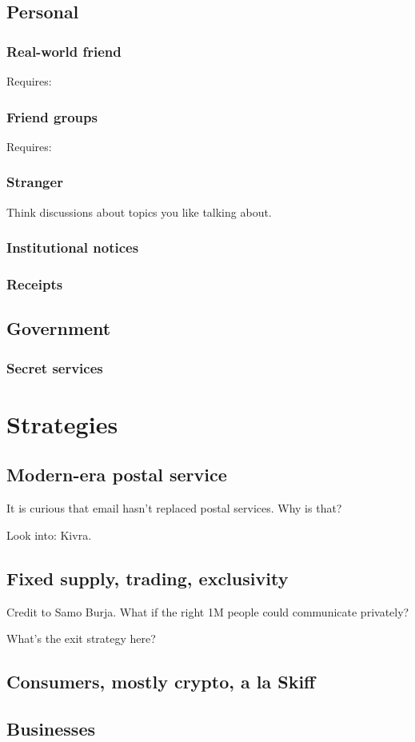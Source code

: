 \documentclass[sigconf, nonacm, balance=false, natbib=false]{acmart}
\begin{document}
\subsection{Personal}

\subsubsection{Real-world friend}

Requires:

\subsubsection{Friend groups}

Requires:

\subsubsection{Stranger}

Think discussions about topics you like talking about.

\subsubsection{Institutional notices} %

\subsubsection{Receipts}

\subsection{Government}

\subsubsection{Secret services}

\section{Strategies}

\subsection{Modern-era postal service}

It is curious that email hasn't replaced postal services. Why is that?

Look into: Kivra.

\subsection{Fixed supply, trading, exclusivity}

Credit to Samo Burja. What if the right 1M people could communicate privately?

What's the exit strategy here?

\subsection{Consumers, mostly crypto, a la Skiff}

\subsection{Businesses}

\printbibliography
\end{document}
